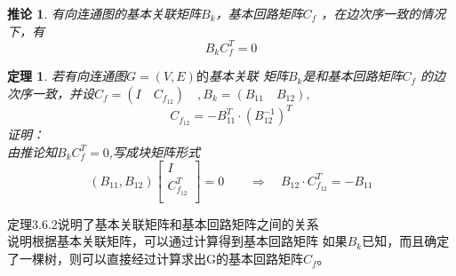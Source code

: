 \documentclass[11pt,a4paper,openany]{book}
\newcommand{\song}{\CJKfamily{song}}
\newtheorem{theorem}{\textbf{定理}}[section]
\newtheorem{coro}{\textbf{推论}}[section]
\begin{document}
\begin{coro}
有向连通图的基本关联矩阵$B_k$，基本回路矩阵$C_f$ ，在边次序一致的情况下，有$$B_kC_f^T=0$$
\end{coro}
\begin{theorem}
若有向连通图$G=(V,E)的$基本关联
矩阵$B_k$是和基本回路矩阵$C_f$ 的边次序一致，并设$C_f=(I \quad C_{f_{12}}) \quad ,B_k=(B_{11} \quad B_{12}),$
$$ C_{f_{12}}=-B_{11}^T\cdot(B_{12}^{-1})^T$$
{\song
证明：\\
由推论知$B_kC^T_f=0$,写成块矩阵形式
\begin{equation*}
(B_{11},B_{12})\left[
                 \begin{array}{c}
                   I \\
                   C_{f_{12}}^T \\
                 \end{array}
               \right]=0\quad \quad \Rightarrow \quad B_{12}\cdot  C_{f_{12}}^T=-B_{11}
\end{equation*}
}
\end{theorem}
\begin{shaded}
定理$3.6.2$说明了基本关联矩阵和基本回路矩阵之间的关系\\
\indent 说明根据基本关联矩阵，可以通过计算得到基本回路矩阵
如果$B_k$已知，而且确定了一棵树，则可以直接经过计算求出G的基本回路矩阵$C_f$。
\end{shaded}
\end{document}
